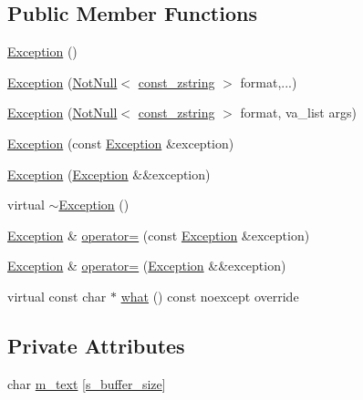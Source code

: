 \subsection*{Public Member Functions}
\begin{DoxyCompactItemize}
\item 
\mbox{\hyperlink{classmage_1_1_exception_a87fd5f6c5465c01244020afbaebdb9f5}{Exception}} ()
\item 
\mbox{\hyperlink{classmage_1_1_exception_ace796ee1ef1e8969b043cd0b3f0b23e0}{Exception}} (\mbox{\hyperlink{namespacemage_a8769f9d670d6b585ea306cb1062af94b}{Not\+Null}}$<$ \mbox{\hyperlink{namespacemage_abfd9206dc607ceb5d13ec68bf075a5c0}{const\+\_\+zstring}} $>$ format,...)
\item 
\mbox{\hyperlink{classmage_1_1_exception_aaae8328720d103e5726758673943b756}{Exception}} (\mbox{\hyperlink{namespacemage_a8769f9d670d6b585ea306cb1062af94b}{Not\+Null}}$<$ \mbox{\hyperlink{namespacemage_abfd9206dc607ceb5d13ec68bf075a5c0}{const\+\_\+zstring}} $>$ format, va\+\_\+list args)
\item 
\mbox{\hyperlink{classmage_1_1_exception_a3f8642ade2ed1168a9853a50ee0e8e98}{Exception}} (const \mbox{\hyperlink{classmage_1_1_exception}{Exception}} \&exception)
\item 
\mbox{\hyperlink{classmage_1_1_exception_a5a745eb8921cb986c822c0f95455314a}{Exception}} (\mbox{\hyperlink{classmage_1_1_exception}{Exception}} \&\&exception)
\item 
virtual \mbox{\hyperlink{classmage_1_1_exception_a088e91ba8dffd31a9d6aa7d4af2ee2c0}{$\sim$\+Exception}} ()
\item 
\mbox{\hyperlink{classmage_1_1_exception}{Exception}} \& \mbox{\hyperlink{classmage_1_1_exception_ab0e7e6b32b07505271a4a88067ab54f4}{operator=}} (const \mbox{\hyperlink{classmage_1_1_exception}{Exception}} \&exception)
\item 
\mbox{\hyperlink{classmage_1_1_exception}{Exception}} \& \mbox{\hyperlink{classmage_1_1_exception_aa9305c6bd8836f56ffa970473533f031}{operator=}} (\mbox{\hyperlink{classmage_1_1_exception}{Exception}} \&\&exception)
\item 
virtual const char $\ast$ \mbox{\hyperlink{classmage_1_1_exception_ae2bd4437e2b7c960f022f7d3bf79baa7}{what}} () const noexcept override
\end{DoxyCompactItemize}
\subsection*{Private Attributes}
\begin{DoxyCompactItemize}
\item 
char \mbox{\hyperlink{classmage_1_1_exception_ad5bd9bb044bebaa1bac36c8c8a25c052}{m\+\_\+text}} \mbox{[}\mbox{\hyperlink{classmage_1_1_exception_a41c9eb8e4a238210822170dfa211e493}{s\+\_\+buffer\+\_\+size}}\mbox{]}
\end{DoxyCompactItemize}
